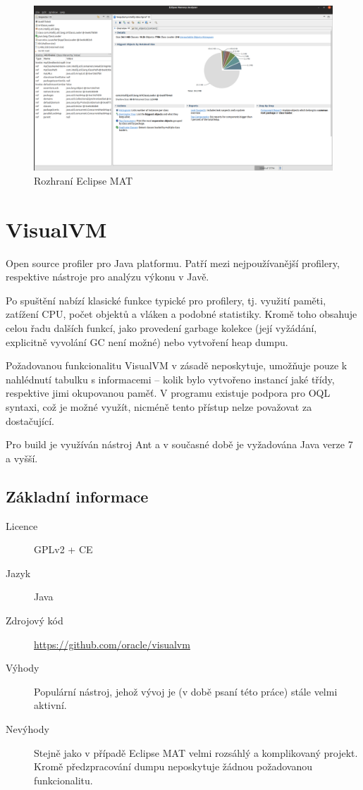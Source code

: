 \begin{figure}[ht!]
	\centering
	\includegraphics[scale=0.3]{obrazky/mat.png}
	\caption{Rozhraní Eclipse MAT}
	\label{obr-eclipse-mat}
\end{figure}


\section{VisualVM}
Open source profiler pro Java platformu. Patří mezi nejpoužívanější profilery, respektive nástroje pro analýzu výkonu v Javě.

Po spuštění nabízí klasické funkce typické pro profilery, tj. využití paměti, zatížení CPU, počet objektů a vláken a podobné statistiky. Kromě toho obsahuje celou řadu dalších funkcí, jako provedení garbage kolekce (její vyžádání, explicitně vyvolání GC není možné) nebo vytvoření heap dumpu.

Požadovanou funkcionalitu VisualVM v zásadě neposkytuje, umožňuje pouze k nahlédnutí tabulku s informacemi – kolik bylo vytvořeno instancí jaké třídy, respektive jimi okupovanou paměť. V programu existuje podpora pro OQL syntaxi, což je možné využít, nicméně tento přístup nelze považovat za dostačující.

Pro build je využíván nástroj Ant a v současné době je vyžadována Java verze 7 a vyšší.

\subsection{Základní informace}

\begin{description}
    \item[Licence] GPLv2 + CE
    \item[Jazyk] Java
    \item[Zdrojový kód] \url{https://github.com/oracle/visualvm} 
    \item[Výhody] Populární nástroj, jehož vývoj je (v době psaní této práce) stále velmi aktivní.
    \item[Nevýhody] Stejně jako v případě Eclipse MAT velmi rozsáhlý a komplikovaný projekt. Kromě předzpracování dumpu neposkytuje žádnou požadovanou funkcionalitu.
\end{description}

